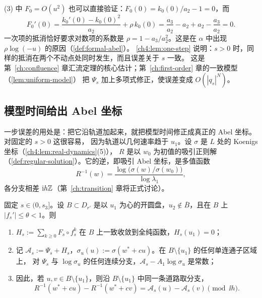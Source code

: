 \begin{remark}\label{ch4:rem:why-alpha2}
(3) 中 $F_0=O(u^2)$ 也可以直接验证：$F_0(0)=k_0(0)/a_2-1=0$，而
\[
 F_0'(0)=\frac{k_0'(0)-k_0(0)^2}{a_2}+\rho\,k_0(0)=\frac{a_3}{a_2}-a_2+a_2-\frac{a_3}{a_2}=0 .
\]
一次项的抵消恰好要求对数项的系数是 $\rho=1-a_3/a_2^2$。这是在 $\alpha$ 中出现 $\rho\log(-u)$ 的原因（\cref{def:formal-abel}）。
\cref{ch4:lem:one-step} 说明：$s>0$ 时，同样的抵消在两个不动点处同时发生，而且误差关于 $s$ 一致。
这是第~\ref{ch:confluence} 章汇流定理的核心估计；第~\ref{ch:first-order} 章的一致模型（\cref{lem:uniform-model}）
把 $\Psi_s$ 加上多项式修正，使误差变成 $O(|q_s|^N)$。
\end{remark}

\subsection{模型时间给出 Abel 坐标}

一步误差的用处是：把它沿轨道加起来，就把模型时间修正成真正的 Abel 坐标。对固定的 $s>0$ 这很容易，
因为轨道以几何速率趋于 $u_1$。设 $\sigma$ 是 $L$ 处的 Koenigs 坐标（\cref{ch4:lem:real-dynamics}(5)），
$R$ 是以 $w_0$ 为初值的吸引正则解（\cref{def:regular-solution}）。它的逆，即吸引 Abel 坐标，是多值函数
\begin{equation}\label{ch4:eq:Rinv}
 R^{-1}(w)=\frac{\log\bigl(\sigma(w)/\sigma(w_0)\bigr)}{\log\lambda_1},
\end{equation}
各分支相差 $\mathrm{i} h\mathbb{Z}$（第~\ref{ch:transition} 章将正式讨论）。

\begin{lemma}\label{ch4:lem:model-abel}
固定 $s\in(0,s_3]$。设 $B\subset D_{r'}$ 是以 $u_1$ 为心的开圆盘，$u_2\notin\overline B$，且在 $B$ 上 $|f_s'|\le\theta<1$。则
\begin{enumerate}
\item $H_s:=\sum_{k\ge0}F_s\circ f_s^k$ 在 $B$ 上一致收敛到全纯函数，$H_s(u_1)=0$；
\item 记 $\mathcal A_s:=\Psi_s+H_s$，$\sigma_u(u):=\sigma(w^*+cu)$。在 $B\setminus\{u_1\}$ 的任何单连通子区域上，
  对 $\Psi_s$ 与 $\log\sigma_u$ 的任何连续分支，$\mathcal A_s-A_1\log\sigma_u$ 是常数；
\item 因此，若 $u,v\in B\setminus\{u_1\}$，则沿 $B\setminus\{u_1\}$ 中同一条道路取分支，
  \[
   R^{-1}(w^*+cu)-R^{-1}(w^*+cv)=\mathcal A_s(u)-\mathcal A_s(v)\pmod{\ii h} .
  \]
\end{enumerate}
\end{lemma}

